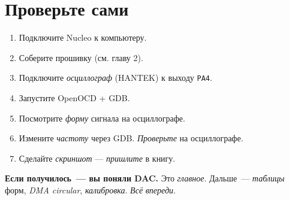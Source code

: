 \section{Проверьте сами}
\label{sec:gen-check}

\begin{enumerate}
    \item Подключите Nucleo к компьютеру.
    \item Соберите прошивку (см. главу 2).
    \item Подключите \emph{осциллограф} (HANTEK) к выходу
          \texttt{PA4}.
    \item Запустите OpenOCD + GDB.
    \item Посмотрите \emph{форму} сигнала на осциллографе.
    \item Измените \emph{частоту} через GDB. \emph{Проверьте}
          на осциллографе.
    \item Сделайте \emph{скриншот} — \emph{пришлите} в книгу.
\end{enumerate}

\begin{ideabox}
\textbf{Если получилось~--- вы поняли DAC.} Это
\emph{главное}. Дальше~--- \emph{таблицы} форм,
\emph{DMA circular}, \emph{калибровка}. \emph{Всё}
\emph{впереди}.
\end{ideabox}

